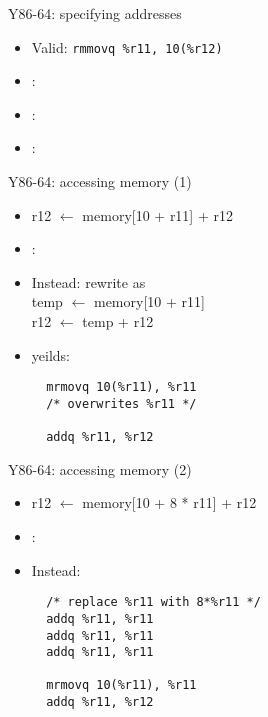 \begin{frame}[label=Y86memory1,fragile]{Y86-64: specifying addresses}
\begin{itemize}
\item Valid: \lstinline|rmmovq %r11, 10(%r12)|
\item<2-> :  
\item<2-> :  
\item<2-> :  
\end{itemize}
\end{frame}

\begin{frame}[label=Y86memory2,fragile]{Y86-64: accessing memory (1)}
\begin{itemize}
\item r12 $\leftarrow$ memory[10 + r11] + r12
\item {}:  \\
\item<2-> Instead: rewrite as \\
    temp $\leftarrow$ memory[10 + r11] \\
    r12 $\leftarrow$ temp + r12 
\item<3-> yeilds:
\begin{lstlisting}
  mrmovq 10(%r11), %r11
  /* overwrites %r11 */

  addq %r11, %r12
\end{lstlisting}
\end{itemize}
\end{frame}

\begin{frame}[label=Y86memory3,fragile]{Y86-64: accessing memory (2)}
\begin{itemize}
\item r12 $\leftarrow$ memory[10 + 8 * r11] + r12
\item {}: \\
\item<2-> Instead:
\begin{lstlisting}
  /* replace %r11 with 8*%r11 */
  addq %r11, %r11
  addq %r11, %r11
  addq %r11, %r11

  mrmovq 10(%r11), %r11
  addq %r11, %r12
\end{lstlisting}
\end{itemize}
\end{frame}


